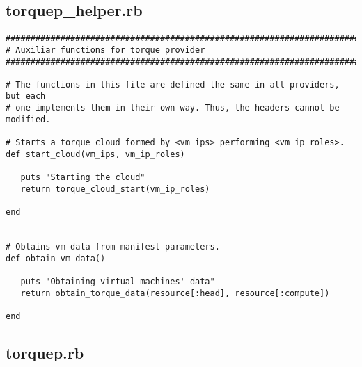 \subsection{torquep\_helper.rb}


\begin{lstlisting}
################################################################################
# Auxiliar functions for torque provider
################################################################################

# The functions in this file are defined the same in all providers, but each
# one implements them in their own way. Thus, the headers cannot be modified.

# Starts a torque cloud formed by <vm_ips> performing <vm_ip_roles>.
def start_cloud(vm_ips, vm_ip_roles)

   puts "Starting the cloud"
   return torque_cloud_start(vm_ip_roles)

end


# Obtains vm data from manifest parameters.
def obtain_vm_data()

   puts "Obtaining virtual machines' data"
   return obtain_torque_data(resource[:head], resource[:compute])
   
end
\end{lstlisting}


\subsection{torquep.rb}


